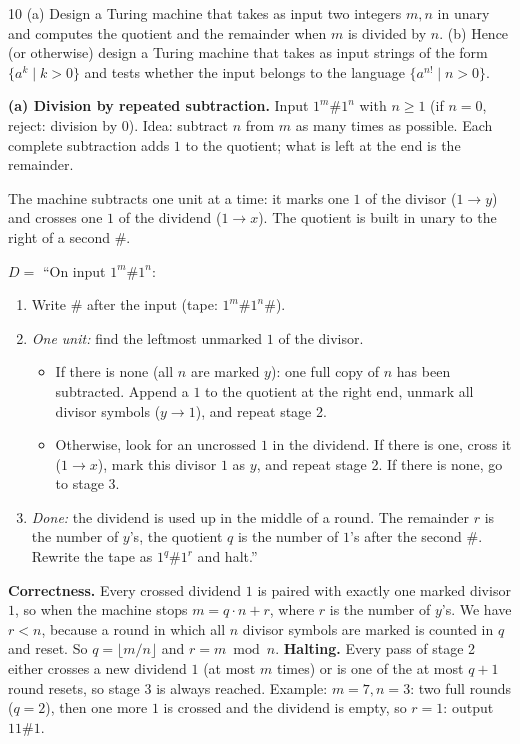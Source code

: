 \begin{question}{10}
(a) Design a Turing machine that takes as input two integers $m,n$ in unary and computes the quotient and the remainder when $m$ is divided by $n$.
(b) Hence (or otherwise) design a Turing machine that takes as input strings of the form $\{a^k\mid k>0\}$ and tests whether the input belongs to the language $\{a^{n!}\mid n>0\}$.
\end{question}
\begin{soln}
\textbf{(a) Division by repeated subtraction.} Input $1^m\#1^n$ with $n\ge1$ (if $n=0$, reject: division by $0$). Idea: subtract $n$ from $m$ as many times as possible. Each complete subtraction adds $1$ to the quotient; what is left at the end is the remainder.

The machine subtracts one unit at a time: it marks one $1$ of the divisor ($1\to y$) and crosses one $1$ of the dividend ($1\to x$). The quotient is built in unary to the right of a second $\#$.

$D=$ ``On input $1^m\#1^n$:
\begin{enumerate}
\item Write $\#$ after the input (tape: $1^m\#1^n\#$).
\item \emph{One unit:} find the leftmost unmarked $1$ of the divisor.
  \begin{itemize}
  \item If there is none (all $n$ are marked $y$): one full copy of $n$ has been subtracted. Append a $1$ to the quotient at the right end, unmark all divisor symbols ($y\to1$), and repeat stage 2.
  \item Otherwise, look for an uncrossed $1$ in the dividend. If there is one, cross it ($1\to x$), mark this divisor $1$ as $y$, and repeat stage 2. If there is none, go to stage 3.
  \end{itemize}
\item \emph{Done:} the dividend is used up in the middle of a round. The remainder $r$ is the number of $y$'s, the quotient $q$ is the number of $1$'s after the second $\#$. Rewrite the tape as $1^q\#1^r$ and halt.''
\end{enumerate}

\textbf{Correctness.} Every crossed dividend $1$ is paired with exactly one marked divisor $1$, so when the machine stops $m=q\cdot n+r$, where $r$ is the number of $y$'s. We have $r<n$, because a round in which all $n$ divisor symbols are marked is counted in $q$ and reset. So $q=\lfloor m/n\rfloor$ and $r=m\bmod n$.
\textbf{Halting.} Every pass of stage 2 either crosses a new dividend $1$ (at most $m$ times) or is one of the at most $q+1$ round resets, so stage 3 is always reached.
Example: $m=7,n=3$: two full rounds ($q=2$), then one more $1$ is crossed and the dividend is empty, so $r=1$: output $11\#1$.


\end{soln}
